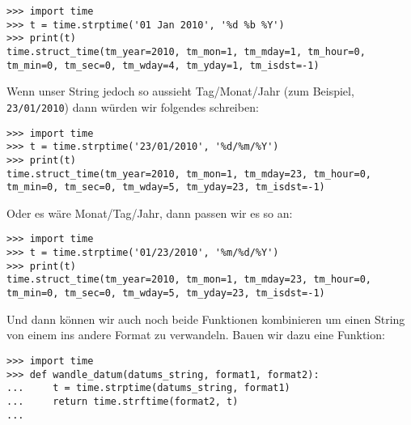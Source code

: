 \begin{Verbatim}[frame=single]
>>> import time
>>> t = time.strptime('01 Jan 2010', '%d %b %Y')
>>> print(t)
time.struct_time(tm_year=2010, tm_mon=1, tm_mday=1, tm_hour=0, 
tm_min=0, tm_sec=0, tm_wday=4, tm_yday=1, tm_isdst=-1)
\end{Verbatim}

\noindent
Wenn unser String jedoch so aussieht Tag/Monat/Jahr (zum Beispiel, \verb+23/01/2010+) dann würden wir folgendes schreiben:

\begin{Verbatim}[frame=single]
>>> import time
>>> t = time.strptime('23/01/2010', '%d/%m/%Y')
>>> print(t)
time.struct_time(tm_year=2010, tm_mon=1, tm_mday=23, tm_hour=0, 
tm_min=0, tm_sec=0, tm_wday=5, tm_yday=23, tm_isdst=-1)

\end{Verbatim}

\noindent
Oder es wäre Monat/Tag/Jahr, dann passen wir es so an:

\begin{Verbatim}[frame=single]
>>> import time
>>> t = time.strptime('01/23/2010', '%m/%d/%Y')
>>> print(t)
time.struct_time(tm_year=2010, tm_mon=1, tm_mday=23, tm_hour=0, 
tm_min=0, tm_sec=0, tm_wday=5, tm_yday=23, tm_isdst=-1)
\end{Verbatim}

\noindent
Und dann können wir auch noch beide Funktionen kombinieren um einen String von einem ins andere Format zu verwandeln. Bauen wir dazu eine Funktion:

\begin{Verbatim}[frame=single]
>>> import time
>>> def wandle_datum(datums_string, format1, format2):
...     t = time.strptime(datums_string, format1)
...     return time.strftime(format2, t)
...
\end{Verbatim}

